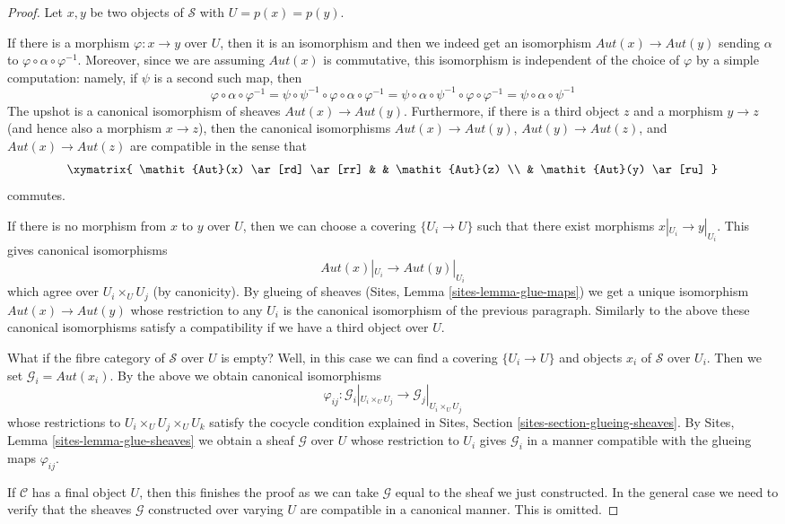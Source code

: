 \begin{proof}
Let $x, y$ be two objects of $\mathcal{S}$ with $U = p(x) = p(y)$.

\medskip\noindent
If there is a morphism $\varphi : x \to y$ over $U$, then it is an
isomorphism and then we indeed get an isomorphism
$\mathit{Aut}(x) \to \mathit{Aut}(y)$ sending
$\alpha$ to $\varphi \circ \alpha \circ \varphi^{-1}$.
Moreover, since we are assuming $\mathit{Aut}(x)$ is
commutative, this isomorphism is independent of the choice
of $\varphi$ by a simple computation: namely, if $\psi$ is
a second such map, then
$$
\varphi \circ \alpha \circ \varphi^{-1} =
\psi \circ \psi^{-1} \circ \varphi \circ \alpha \circ \varphi^{-1} =
\psi \circ \alpha \circ \psi^{-1} \circ \varphi \circ \varphi^{-1} =
\psi \circ \alpha \circ \psi^{-1}
$$
The upshot is a canonical isomorphism of sheaves
$\mathit{Aut}(x) \to \mathit{Aut}(y)$. Furthermore, if there
is a third object $z$ and a morphism $y \to z$ (and hence
also a morphism $x \to z$), then the
canonical isomorphisms $\mathit{Aut}(x) \to \mathit{Aut}(y)$,
$\mathit{Aut}(y) \to \mathit{Aut}(z)$, and
$\mathit{Aut}(x) \to \mathit{Aut}(z)$ are compatible in the sense
that
$$
\xymatrix{
\mathit{Aut}(x) \ar[rd] \ar[rr] & &  \mathit{Aut}(z) \\
& \mathit{Aut}(y) \ar[ru]
}
$$
commutes.

\medskip\noindent
If there is no morphism from $x$ to $y$ over $U$, then we can
choose a covering $\{U_i \to U\}$ such that there exist morphisms
$x|_{U_i} \to y|_{U_i}$. This gives canonical isomorphisms
$$
\mathit{Aut}(x)|_{U_i} \longrightarrow \mathit{Aut}(y)|_{U_i}
$$
which agree over $U_i \times_U U_j$ (by canonicity). By glueing of
sheaves (Sites, Lemma \ref{sites-lemma-glue-maps}) we get a unique
isomorphism $\mathit{Aut}(x) \to \mathit{Aut}(y)$ whose restriction
to any $U_i$ is the canonical isomorphism of the previous paragraph.
Similarly to the above these canonical isomorphisms satisfy
a compatibility if we have a third object over $U$.

\medskip\noindent
What if the fibre category of $\mathcal{S}$ over $U$ is empty?
Well, in this case we can find a covering $\{U_i \to U\}$
and objects $x_i$ of $\mathcal{S}$ over $U_i$. Then we set
$\mathcal{G}_i = \mathit{Aut}(x_i)$. By the above we obtain
canonical isomorphisms
$$
\varphi_{ij} :
\mathcal{G}_i|_{U_i \times_U U_j}
\longrightarrow
\mathcal{G}_j|_{U_i \times_U U_j}
$$
whose restrictions to $U_i \times_U U_j \times_U U_k$ satisfy
the cocycle condition explained in Sites, Section
\ref{sites-section-glueing-sheaves}.
By Sites, Lemma \ref{sites-lemma-glue-sheaves}
we obtain a sheaf $\mathcal{G}$ over $U$ whose
restriction to $U_i$ gives $\mathcal{G}_i$
in a manner compatible with the glueing maps $\varphi_{ij}$.

\medskip\noindent
If $\mathcal{C}$ has a final object $U$, then this finishes the proof
as we can take $\mathcal{G}$ equal to the sheaf we just constructed.
In the general case we need to verify that the sheaves $\mathcal{G}$
constructed over varying $U$ are compatible in a canonical manner.
This is omitted.
\end{proof}








